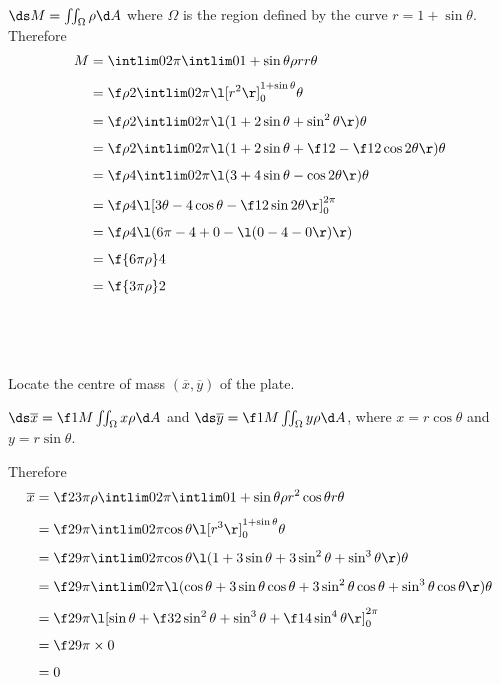 \documentclass[a4paper]{article}
\begin{document}
$\ds M = \iint_\Omega \rho \d A$ where $\Omega$ is the region defined by the curve $r = 1 + \sin \theta$. Therefore \begin{align*}
M &= \intlim 0{2\pi} {\intlim 0 {1 + \sin \theta} {\rho r} r} \theta \\[1ex]
&= \f\rho2 \intlim 0{2\pi} {{\l[ r^2 \r]}_0^{1 + \sin \theta}} \theta \\[1ex]
&= \f\rho2 \intlim 0{2\pi} {\l( 1 + 2\sin\theta + \sin^2 \theta \r)} \theta \\[1ex]
&= \f\rho2 \intlim 0{2\pi} {\l( 1 + 2\sin\theta + \f12 - \f12 \cos 2\theta \r)} \theta \\[1ex]
&= \f\rho4 \intlim 0{2\pi} {\l( 3 + 4\sin\theta - \cos 2\theta \r)} \theta \\[1ex]
&= \f\rho4 {\l[ 3\theta - 4\cos\theta - \f12 \sin 2\theta \r]}_0^{2\pi} \\[1ex]
&= \f\rho4 \l( 6\pi - 4 + 0 - \l( 0 - 4 - 0 \r) \r) \\[1ex]
&= \f{6\pi \rho}4 \\[1ex]
&= \f{3\pi \rho}2
\end{align*}

\subsection{~} %

\begin{questionbody}
Locate the centre of mass $(\overline x, \overline y)$ of the plate.
\end{questionbody}

$\ds \overline x = \f1M \iint_\Omega x \rho \d A$ and $\ds \overline y = \f1M \iint_\Omega y \rho \d A$, where $x = r\cos\theta$ and $y = r\sin\theta$.

Therefore \begin{align*}
\overline x &= \f2{3\pi\rho} \intlim 0{2\pi} {\intlim 0 {1 + \sin \theta} {\rho r^2 \cos \theta} r} \theta \\[1ex]
&= \f2{9\pi} \intlim 0{2\pi} {\cos \theta {\l[r^3\r]}_0^{1 + \sin\theta}} \theta \\[1ex]
&= \f2{9\pi} \intlim 0{2\pi} {\cos \theta \l( 1 + 3\sin\theta + 3\sin^2 \theta + \sin^3 \theta \r)} \theta \\[1ex]
 &= \f2{9\pi} \intlim 0{2\pi} {\l( \cos\theta + 3\sin\theta \cos\theta + 3\sin^2 \theta \cos\theta + \sin^3 \theta \cos\theta \r)} \theta \\[1ex]
&= \f2{9\pi} {\l[ \sin\theta + \f32 \sin^2 \theta + \sin^3 \theta + \f14 \sin^4 \theta\r]}_0^{2\pi} \\[1ex]
&= \f2{9\pi} \times 0 \\[1ex]
&= 0
\end{align*}
\end{document}
